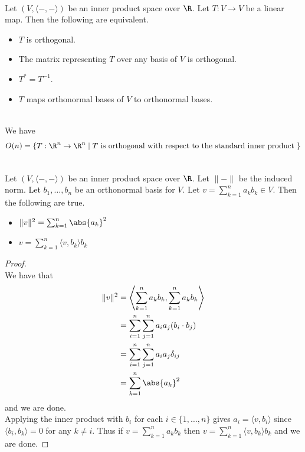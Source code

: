 \documentclass[a4paper]{article}
\begin{document}
\begin{prp}{}{}\\
Let $(V,\langle-,-\rangle)$ be an inner product space over $\R$. Let $T:V\to V$ be a linear map. Then the following are equivalent. 
\begin{itemize}
\item $T$ is orthogonal. 
\item The matrix representing $T$ over any basis of $V$ is orthogonal. 
\item $T^\ast=T^{-1}$. 
\item $T$ maps orthonormal bases of $V$ to orthonormal bases. 
\end{itemize}
\end{prp}

\begin{eg}{}{}\\
We have $$O(n)=\{T:\R^n\to\R^n\;|\;T\text{ is orthogonal with respect to the standard inner product }\}$$
\end{eg}

\begin{prp}{}{}\\
 Let $(V,\langle-,-\rangle)$ be an inner product space over $\R$. Let $\|-\|$ be the induced norm. Let $b_1,\dots,b_n$ be an orthonormal basis for $V$. Let $v=\sum_{k=1}^na_kb_k\in V$. Then the following are true. 
\begin{itemize}
\item $\|v\|^2=\sum_{k=1}^n\abs{a_k}^2$
\item $v=\sum_{k=1}^n\langle v,b_k\rangle b_k$
\end{itemize} 
\begin{proof}\\
We have that 
\begin{align*}
\|v\|^2&=\left\langle\sum_{k=1}^na_kb_k, \sum_{k=1}^na_kb_k\right\rangle \\
&=\sum_{i=1}^n\sum_{j=1}^na_ia_j(b_i\cdot b_j)\\
&=\sum_{i=1}^n\sum_{j=1}^na_ia_j\delta_{ij}\\
&=\sum_{k=1}^n\abs{a_k}^2
\end{align*}
and we are done. \\

Applying the inner product with $b_i$ for each $i\in\{1,\dots,n\}$ gives $a_i=\langle v,b_i\rangle$ since $\langle b_i,b_k\rangle=0$ for any $k\neq i$. Thus if $v=\sum_{k=1}^na_kb_k$ then $v=\sum_{k=1}^n\langle v,b_k\rangle b_k$ and we are done. 
\end{proof}
\end{prp}
\end{document}
